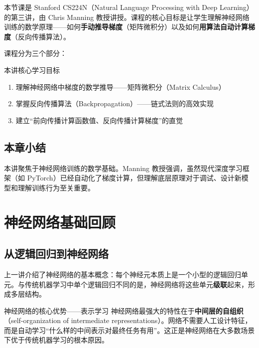 \documentclass[a4paper]{article}
\begin{document}
本节课是 Stanford CS224N（Natural Language Processing with Deep Learning）的第三讲，由 Chris Manning 教授讲授。课程的核心目标是让学生理解神经网络训练的数学原理——如何\textbf{手动推导梯度}（矩阵微积分）以及如何\textbf{用算法自动计算梯度}（反向传播算法）。





课程分为三个部分：





\begin{importantbox}{本讲核心学习目标}
\begin{enumerate}
    \item 理解神经网络中梯度的数学推导——矩阵微积分（Matrix Calculus）
    \item 掌握反向传播算法（Backpropagation）——链式法则的高效实现
    \item 建立``前向传播计算函数值、反向传播计算梯度''的直觉
\end{enumerate}
\end{importantbox}

\subsection{本章小结}

本讲聚焦于神经网络训练的数学基础。Manning 教授强调，虽然现代深度学习框架（如 PyTorch）已经自动化了梯度计算，但理解底层原理对于调试、设计新模型和理解训练行为至关重要。


\section{神经网络基础回顾}

\subsection{从逻辑回归到神经网络}

上一讲介绍了神经网络的基本概念：每个神经元本质上是一个小型的逻辑回归单元。与传统机器学习中单个逻辑回归不同的是，神经网络将这些单元\textbf{级联}起来，形成多层结构。





\begin{importantbox}{神经网络的核心优势——表示学习}
神经网络最强大的特性在于\textbf{中间层的自组织}（self-organization of intermediate representations）。网络不需要人工设计特征，而是自动学习``什么样的中间表示对最终任务有用''。这正是神经网络在大多数场景下优于传统机器学习的根本原因。
\end{importantbox}
\end{document}

